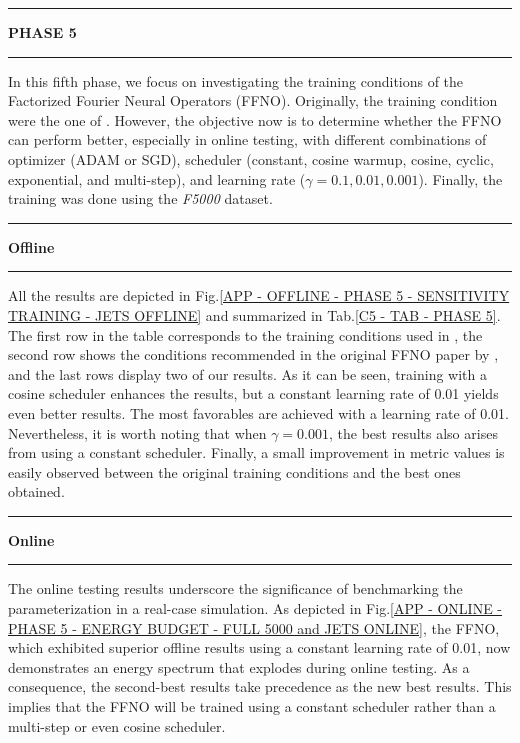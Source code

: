 
%
%
\newpage
\rule[0cm]{\linewidth}{0.075cm}
\begin{center}
\Large \textbf{PHASE 5}
\end{center}
\vspace{0.15cm}
\rule[0.3cm]{\linewidth}{0.075cm}

In this fifth phase, we focus on investigating the training conditions of the Factorized Fourier Neural Operators (FFNO). Originally, the training condition were the one of \cite{Benchmarking}. However, the objective now is to determine whether the FFNO can perform better, especially in online testing, with different combinations of optimizer (ADAM or SGD), scheduler (constant, cosine warmup, cosine, cyclic, exponential, and multi-step), and learning rate ($\gamma = 0.1, 0.01, 0.001$). Finally, the training was done using the \textit{F5000} dataset.\\

\rule[0cm]{\linewidth}{0.025cm}
\begin{center}
\small \textbf{Offline}
\end{center}
\rule[0.3cm]{\linewidth}{0.025cm}

All the results are depicted in Fig.\ref{APP - OFFLINE - PHASE 5 - SENSITIVITY TRAINING - JETS OFFLINE} and summarized in Tab.\ref{C5 - TAB - PHASE 5}. The first row in the table corresponds to the training conditions used in \cite{Benchmarking}, the second row shows the conditions recommended in the original FFNO paper by \cite{FFNO}, and the last rows display two of our results. As it can be seen, training with a cosine scheduler enhances the results, but a constant learning rate of 0.01 yields even better results. The most favorables are achieved with a learning rate of 0.01. Nevertheless, it is worth noting that when $\gamma = 0.001$, the best results also arises from using a constant scheduler. Finally, a small improvement in metric values is easily observed between the original training conditions and the best ones obtained.\\

\rule[0cm]{\linewidth}{0.025cm}
\begin{center}
\small \textbf{Online}
\end{center}
\rule[0.3cm]{\linewidth}{0.025cm}

The online testing results underscore the significance of benchmarking the parameterization in a real-case simulation. As depicted in Fig.\ref{APP - ONLINE - PHASE 5 - ENERGY BUDGET -  FULL 5000 and JETS ONLINE}, the FFNO, which exhibited superior offline results using a constant learning rate of 0.01, now demonstrates an energy spectrum that explodes during online testing. As a consequence, the second-best results take precedence as the new best results. This implies that the FFNO will be trained using a constant scheduler rather than a multi-step or even cosine scheduler.\\

